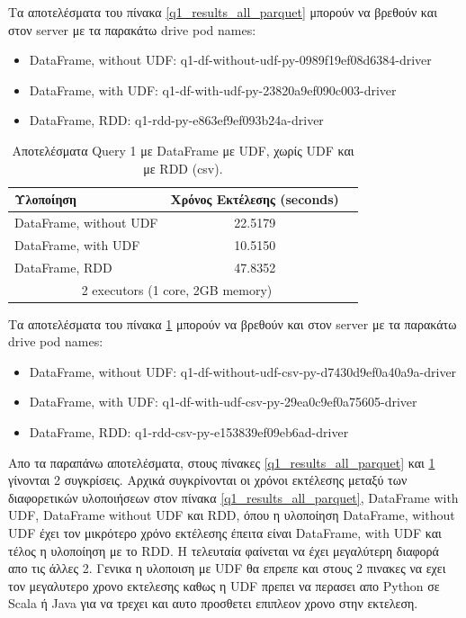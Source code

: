 \documentclass[12pt, a4paper]{article}
\begin{document}
\noindent Τα αποτελέσματα του πίνακα \ref{q1_results_all_parquet} μπορούν να βρεθούν και στον server
με τα παρακάτω drive pod names: 

\begin{itemize}
\item DataFrame, without UDF: q1-df-without-udf-py-0989f19ef08d6384-driver
\item DataFrame, with UDF: q1-df-with-udf-py-23820a9ef090c003-driver
\item DataFrame, RDD: q1-rdd-py-e863ef9ef093b24a-driver
\end{itemize}


\begin{table}[h!]
\centering
\begin{tabular}{lcc} 
\hline
Υλοποίηση & Χρόνος Εκτέλεσης (seconds) \\ 
\hline
DataFrame, without UDF &  22.5179 \\
DataFrame, with UDF    &  10.5150 \\
DataFrame, RDD         &  47.8352 \\

\hline
\multicolumn{2}{c}{2 executors (1 core, 2GB memory)}
\end{tabular}
\caption{Αποτελέσματα Query 1 με DataFrame με UDF, χωρίς UDF και με RDD (csv).}
\label{q1_results_all_csv}
\end{table}

\noindent Τα αποτελέσματα του πίνακα \ref{q1_results_all_csv} μπορούν να βρεθούν και στον server
με τα παρακάτω drive pod names: 

\begin{itemize}
\item DataFrame, without UDF: q1-df-without-udf-csv-py-d7430d9ef0a40a9a-driver
\item DataFrame, with UDF: q1-df-with-udf-csv-py-29ea0c9ef0a75605-driver
\item DataFrame, RDD: q1-rdd-csv-py-e153839ef09eb6ad-driver
\end{itemize}

Απο τα παραπάνω αποτελέσματα, στους πίνακες \ref{q1_results_all_parquet} και \ref{q1_results_all_csv}
γίνονται 2 συγκρίσεις. Αρχικά συγκρίνονται οι χρόνοι εκτέλεσης μεταξύ των διαφορετικών
υλοποιήσεων στον πίνακα \ref{q1_results_all_parquet}, DataFrame with UDF, 
DataFrame without UDF και RDD, όπου η υλοποίηση DataFrame, without UDF έχει 
τον μικρότερο χρόνο εκτέλεσης έπειτα είναι DataFrame, with UDF και τέλος 
η υλοποίηση με το RDD. Η τελευταία φαίνεται να έχει μεγαλύτερη διαφορά 
απο τις άλλες 2. Γενικα η υλοποιση με UDF θα επρεπε και στους 2 πινακες
να εχει τον μεγαλυτερο χρονο εκτελεσης καθως η UDF πρεπει να περασει απο
Python σε Scala ή Java για να τρεχει και αυτο προσθετει επιπλεον χρονο
στην εκτελεση.
\end{document}
